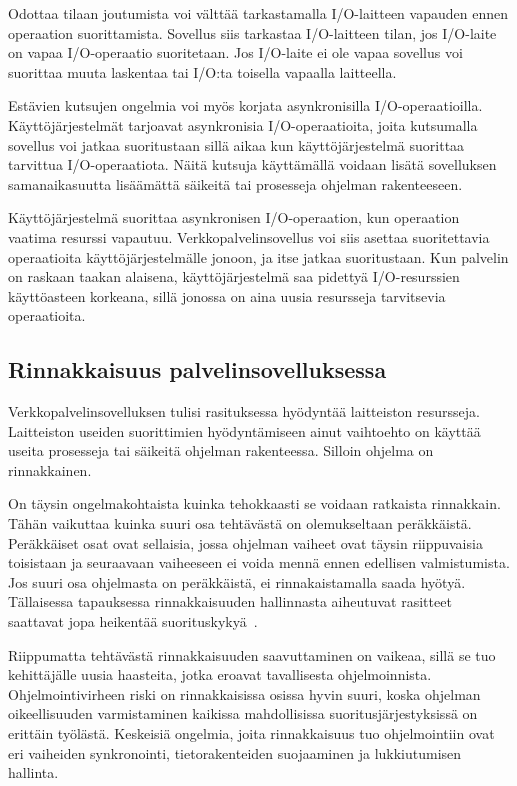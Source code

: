 \documentclass[finnish]{tktltiki2}
\theoremstyle{definition}
\theoremstyle{remark}
\begin{document}
Odottaa tilaan joutumista voi välttää tarkastamalla
I/O-laitteen vapauden ennen operaation suorittamista.
Sovellus siis tarkastaa I/O-laitteen tilan, jos
I/O-laite on vapaa I/O-operaatio suoritetaan. Jos I/O-laite
ei ole vapaa sovellus voi suorittaa muuta laskentaa tai I/O:ta
toisella vapaalla laitteella.

Estävien kutsujen ongelmia voi myös korjata asynkronisilla I/O-operaatioilla.
Käyttöjärjestelmät tarjoavat asynkronisia I/O-operaatioita, joita kutsumalla
sovellus voi jatkaa suoritustaan sillä aikaa kun käyttöjärjestelmä
suorittaa tarvittua I/O-operaatiota. Näitä kutsuja käyttämällä voidaan
lisätä sovelluksen samanaikasuutta lisäämättä säikeitä
tai prosesseja ohjelman rakenteeseen.

Käyttöjärjestelmä suorittaa asynkronisen I/O-operaation,
kun operaation vaatima resurssi vapautuu. Verkkopalvelinsovellus
voi siis asettaa suoritettavia operaatioita käyttöjärjestelmälle
jonoon, ja itse jatkaa suoritustaan. Kun palvelin
on raskaan taakan alaisena, käyttöjärjestelmä saa pidettyä
I/O-resurssien käyttöasteen korkeana, sillä jonossa on aina
uusia resursseja tarvitsevia operaatioita.

\subsection{Rinnakkaisuus palvelinsovelluksessa}
Verkkopalvelinsovelluksen tulisi rasituksessa hyödyntää 
laitteiston resursseja. Laitteiston useiden suorittimien
hyödyntämiseen ainut vaihtoehto on käyttää
useita prosesseja tai säikeitä ohjelman rakenteessa.
Silloin ohjelma on rinnakkainen.

On täysin ongelmakohtaista kuinka tehokkaasti se voidaan ratkaista rinnakkain.
Tähän vaikuttaa kuinka suuri osa tehtävästä on olemukseltaan peräkkäistä.
Peräkkäiset osat ovat sellaisia, jossa ohjelman vaiheet ovat täysin
riippuvaisia toisistaan ja seuraavaan vaiheeseen ei voida mennä ennen edellisen
valmistumista. Jos suuri osa ohjelmasta on peräkkäistä, ei rinnakaistamalla
saada hyötyä. Tällaisessa tapauksessa rinnakkaisuuden hallinnasta aiheutuvat
rasitteet saattavat jopa heikentää suorituskykyä~\cite{stallings_operating_2018}.

Riippumatta tehtävästä rinnakkaisuuden saavuttaminen on vaikeaa,
sillä se tuo kehittäjälle uusia haasteita, jotka eroavat tavallisesta
ohjelmoinnista. Ohjelmointivirheen riski on rinnakkaisissa osissa hyvin suuri,
koska ohjelman oikeellisuuden varmistaminen kaikissa mahdollisissa
suoritusjärjestyksissä on erittäin työlästä.
Keskeisiä ongelmia, joita rinnakkaisuus tuo ohjelmointiin ovat eri vaiheiden
synkronointi, tietorakenteiden suojaaminen ja lukkiutumisen hallinta.
\end{document}
